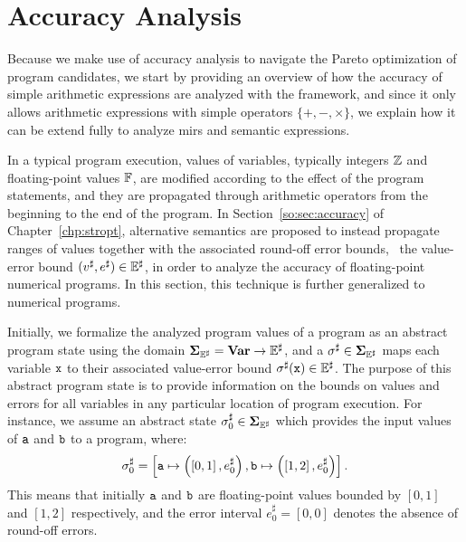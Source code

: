 \section{Accuracy Analysis}
\label{po:sec:accuracy_analysis}

Because we make use of accuracy analysis to navigate the Pareto optimization
of program candidates, we start by providing an overview of how the accuracy
of simple arithmetic expressions are analyzed with the \soap{} framework, and
since it only allows arithmetic expressions with simple operators $\{+, -,
\times\}$, we explain how it can be extend fully to analyze \glspl{mir} and
semantic expressions.

In a typical program execution, values of variables, typically integers
$\mathbb{Z}$ and floating-point values $\mathbb{F}$, are modified according
to the effect of the program statements, and they are propagated through
arithmetic operators from the beginning to the end of the program.  In
Section~\ref{so:sec:accuracy} of Chapter~\ref{chp:stropt}, alternative
semantics are proposed to instead propagate ranges of values together with
the associated round-off error bounds, \ie~the value-error bound $(v^\sharp,
e^\sharp) \in \mathbb{E}^\sharp$, in order to analyze the accuracy of floating-point
numerical programs.  In this section, this technique is further generalized to
numerical programs.

Initially, we formalize the analyzed program values of a program as an abstract
program state using the domain $\mathbf{\Sigma}_{\mathbb{E}^\sharp} = \mathbf{Var} \to \mathbb{E}^\sharp$, and a
$\sigma^\sharp \in \mathbf{\Sigma}_{\mathbb{E}^\sharp}$ maps each variable $\texttt{x}$ to their associated
value-error bound $\sigma^\sharp(\texttt{x}) \in \mathbb{E}^\sharp$.  The purpose of this
abstract program state is to provide information on the bounds on values and
errors for all variables in any particular location of program execution.  For
instance, we assume an abstract state $\sigma^\sharp_0 \in \mathbf{\Sigma}_{\mathbb{E}^\sharp}$ which
provides the input values of $\texttt{a}$ and $\texttt{b}$ to a program, where:
\begin{equation}
    \sigma^\sharp_0 = \left[
        \texttt{a} \mapsto \left(\left[{0}, {1}\right], e^\sharp_0\right),
        \texttt{b} \mapsto \left(\left[{1}, {2}\right], e^\sharp_0\right) \right].
    \label{so:eq:example_state}
\end{equation}
This means that initially $\texttt{a}$ and $\texttt{b}$ are floating-point values bounded
by $[0, 1]$ and $[1, 2]$ respectively, and the error interval $e^\sharp_0 =
[0, 0]$ denotes the absence of round-off errors.

